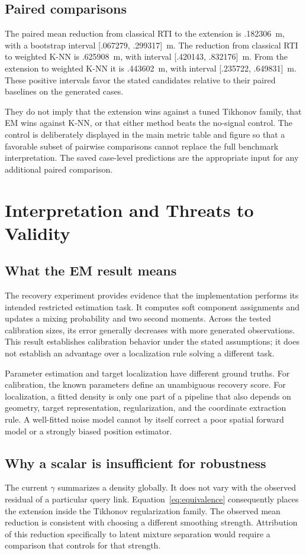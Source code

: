 \documentclass[conference,letterpaper]{IEEEtran}
\begin{document}
\subsection{Paired comparisons}
The paired mean reduction from classical RTI to the extension is .182306~m, with a bootstrap interval [.067279, .299317]~m. The reduction from classical RTI to weighted K-NN is .625908~m, with interval [.420143, .832176]~m. From the extension to weighted K-NN it is .443602~m, with interval [.235722, .649831]~m. These positive intervals favor the stated candidates relative to their paired baselines on the generated cases.

They do not imply that the extension wins against a tuned Tikhonov family, that EM wins against K-NN, or that either method beats the no-signal control. The control is deliberately displayed in the main metric table and figure so that a favorable subset of pairwise comparisons cannot replace the full benchmark interpretation. The saved case-level predictions are the appropriate input for any additional paired comparison.

\section{Interpretation and Threats to Validity}
\subsection{What the EM result means}
The recovery experiment provides evidence that the implementation performs its intended restricted estimation task. It computes soft component assignments and updates a mixing probability and two second moments. Across the tested calibration sizes, its error generally decreases with more generated observations. This result establishes calibration behavior under the stated assumptions; it does not establish an advantage over a localization rule solving a different task.

Parameter estimation and target localization have different ground truths. For calibration, the known parameters define an unambiguous recovery score. For localization, a fitted density is only one part of a pipeline that also depends on geometry, target representation, regularization, and the coordinate extraction rule. A well-fitted noise model cannot by itself correct a poor spatial forward model or a strongly biased position estimator.

\subsection{Why a scalar is insufficient for robustness}
The current $\gamma$ summarizes a density globally. It does not vary with the observed residual of a particular query link. Equation~\eqref{eq:equivalence} consequently places the extension inside the Tikhonov regularization family. The observed mean reduction is consistent with choosing a different smoothing strength. Attribution of this reduction specifically to latent mixture separation would require a comparison that controls for that strength.
\end{document}
